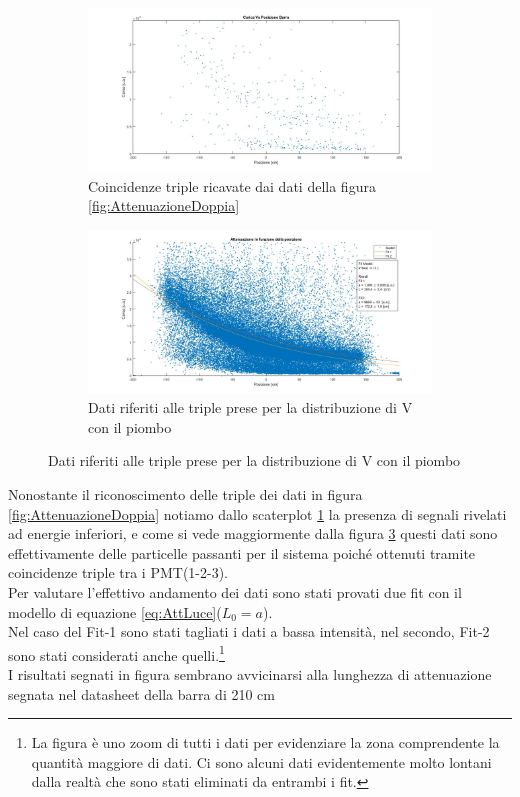 \documentclass[a4paper]{article}
\begin{document}
\begin{figure}[H]
\begin{subfigure}[b]{0.45\textwidth}
\includegraphics[width=\textwidth]{./immagini/TimeOfFlight/AttenuazioneTripla.jpg}
\caption{Coincidenze triple ricavate dai dati della figura \ref{fig:AttenuazioneDoppia}}
\label{fig:AttenuazioneTripla}
\end{subfigure}
\begin{subfigure}[b]{0.45\textwidth}
\includegraphics[width=\textwidth]{./immagini/TimeOfFlight/AttenuazioneMatlab.jpg}
\caption{Dati riferiti alle triple prese per la distribuzione di V con il piombo}
\label{fig:AttenuazioneTriplaFitta}
\end{subfigure}
\end{figure}

Nonostante il riconoscimento delle triple dei dati in figura \ref{fig:AttenuazioneDoppia} notiamo dallo scaterplot \ref{fig:AttenuazioneTripla} la presenza di segnali rivelati ad energie inferiori, e come si vede maggiormente dalla figura \ref{fig:AttenuazioneTriplaFitta} questi dati sono effettivamente delle particelle passanti per il sistema poiché ottenuti tramite coincidenze triple tra i PMT(1-2-3).\\
Per valutare l'effettivo andamento dei dati sono stati provati due fit con il modello di equazione \ref{eq:AttLuce}($L_0 = a$).\\
Nel caso del Fit-1 sono stati tagliati i dati a bassa intensità, nel secondo, Fit-2 sono stati considerati anche quelli.\footnote{La figura è uno zoom di tutti i dati per evidenziare la zona comprendente la quantità maggiore di dati. Ci sono alcuni dati evidentemente molto lontani dalla realtà che sono stati eliminati da entrambi i fit.}\\
I risultati segnati in figura sembrano avvicinarsi alla lunghezza di attenuazione segnata nel datasheet della barra di 210 cm
\end{document}
